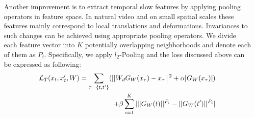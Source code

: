 Another improvement is to extract temporal slow features by applying pooling operators in feature space. 
In natural video and on small spatial scales these features mainly correspond to local translations and deformations. 
Invariances to such changes can be achieved using appropriate pooling operators.
We divide each feature vector into $K$ potentially overlapping neighborhoods and denote each of them as $P_i$. 
Specifically, we apply $l_2$-Pooling and the loss discussed above can be expressed as following:
\begin{equation}
\begin{split}
\lagr_T(x_t, x_t\rq{}, W) = \sum_{\tau = \{t, t\rq{}\}} (||W_d G_W(x_\tau) - x_\tau||^2 + \alpha |G_W(x_\tau)|) \\
+ \beta \sum_{i=1}^K |||G_W(t)||^{P_i} -  ||G_W(t\rq{})||^{P_i}|
\end{split}
\end{equation}
